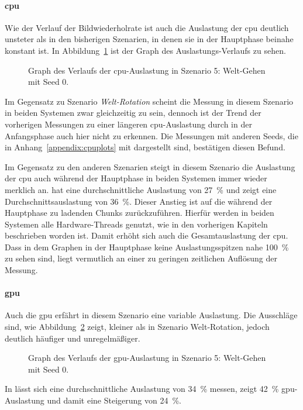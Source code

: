 \paragraph{\ac{cpu}}
Wie der Verlauf der Bildwiederholrate ist auch die Auslastung der \ac{cpu} deutlich unsteter als in den bisherigen Szenarien, in denen sie in der Hauptphase beinahe konstant ist. In Abbildung~\ref{fig:seed-0-walk-cpu} ist der Graph des Auslastungs-Verlaufs zu sehen.
\begin{figure}[!htbp]
	\caption[Graph des Verlaufs der -Auslastung in Szenario 5: Welt-Gehen mit Seed 0.]{Graph des Verlaufs der \ac{cpu}-Auslastung in Szenario 5: Welt-Gehen mit Seed 0.}\label{fig:seed-0-walk-cpu}
\end{figure}
Im Gegensatz zu Szenario \emph{Welt-Rotation} scheint die Messung in diesem Szenario in beiden Systemen zwar gleichzeitig zu sein, dennoch ist der Trend der vorherigen Messungen zu einer längeren \ac{cpu}-Auslastung durch \sysB{} in der Anfangsphase auch hier nicht zu erkennen. Die Messungen mit anderen Seeds, die in Anhang~\vref{appendix:cpuplots} mit dargestellt sind, bestätigen diesen Befund.

Im Gegensatz zu den anderen Szenarien steigt in diesem Szenario die Auslastung der \ac{cpu} auch während der Hauptphase in beiden Systemen immer wieder merklich an. \sysA{} hat eine durchschnittliche Auslastung von \SI{27}{\percent} und \sysB{} zeigt eine Durchschnittsauslastung von \SI{36}{\percent}. Dieser Anstieg ist auf die während der Hauptphase zu ladenden Chunks zurückzuführen. Hierfür werden in beiden Systemen alle Hardware-Threads genutzt, wie in den vorherigen Kapiteln beschrieben worden ist. Damit erhöht sich auch die Gesamtauslastung der \ac{cpu}. Dass in dem Graphen in der Hauptphase keine Auslastungsspitzen nahe \SI{100}{\percent} zu sehen sind, liegt vermutlich an einer zu geringen zeitlichen Auflösung der Messung.

\paragraph{\ac{gpu}}
Auch die \ac{gpu} erfährt in diesem Szenario eine variable Auslastung. Die Ausschläge sind, wie Abbildung~\ref{fig:seed-0-walk-gpu} zeigt, kleiner als in Szenario Welt-Rotation, jedoch deutlich häufiger und unregelmäßiger.
\begin{figure}[!htbp]
	\caption[Graph des Verlaufs der -Auslastung in Szenario 5: Welt-Gehen mit Seed 0.]{Graph des Verlaufs der \ac{gpu}-Auslastung in Szenario 5: Welt-Gehen mit Seed 0.}\label{fig:seed-0-walk-gpu}
\end{figure}
In \sysA{} lässt sich eine durchschnittliche Auslastung von \SI{34}{\percent} messen, \sysB{} zeigt \SI{42}{\percent} \ac{gpu}-Auslastung und damit eine Steigerung von \SI{24}{\percent}.

